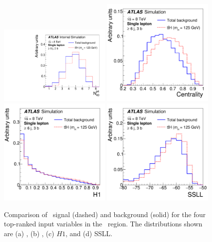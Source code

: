 \begin{figure}[tp]
\begin{center}
\includegraphics[width=0.49\textwidth]{Appendices/Figures_separation/num_jet_40_6jincl_sep5.pdf}
\includegraphics[width=0.49\textwidth]{Appendices/Figures_separation/cent_6jincl_sep5.pdf}\\
\includegraphics[width=0.49\textwidth]{Appendices/Figures_separation/H1_6jincl_sep5.pdf}
\includegraphics[width=0.49\textwidth]{Appendices/Figures_separation/ME_SLL_6jincl_sep5.pdf}
\caption{Comparison of \tth\ signal (dashed) and background (solid) for the four top-ranked input variables 
in the \sixthree\ region.  The distributions shown are (a) \numjetforty, (b) \cent, (c) $H1$, and (d) SSLL.
}
\label{fig:sepinput_lj_2} 
\end{center}
\end{figure}

